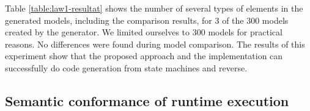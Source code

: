  

Table \ref{table:law1-resultat} shows the number of several types of elements in the generated models, including the comparison results, for 3 of the 300 models created by the generator. We limited ourselves to 300 models for practical reasons. No differences were found during model comparison. The results of this experiment show that the proposed approach and the implementation can successfully do code generation from state machines and reverse. 

%

%

\subsection{Semantic conformance of runtime execution}
\label{subsec:exp2}
